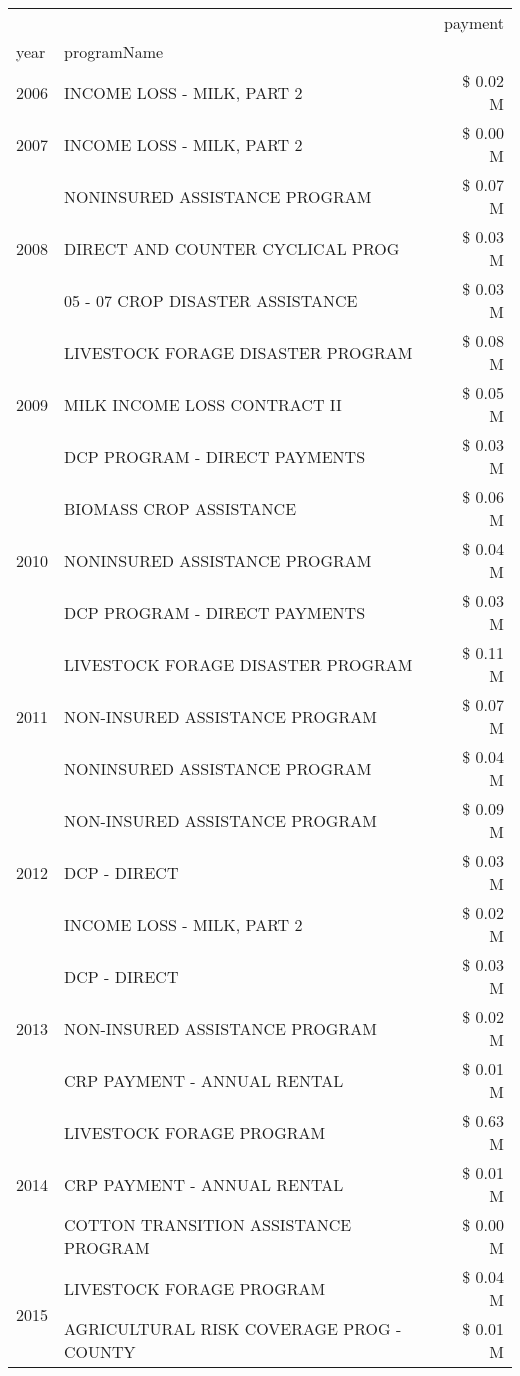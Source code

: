 \begin{tabular}{llr}
\toprule
 &  & payment \\
year & programName &  \\
\midrule
2006 & INCOME LOSS - MILK, PART 2 & \$ 0.02 M \\
\cline{1-3}
2007 & INCOME LOSS - MILK, PART 2 & \$ 0.00 M \\
\cline{1-3}
\multirow[t]{3}{*}{2008} & NONINSURED ASSISTANCE PROGRAM & \$ 0.07 M \\
 & DIRECT AND COUNTER CYCLICAL PROG & \$ 0.03 M \\
 & 05 - 07 CROP DISASTER ASSISTANCE & \$ 0.03 M \\
\cline{1-3}
\multirow[t]{3}{*}{2009} & LIVESTOCK FORAGE DISASTER  PROGRAM & \$ 0.08 M \\
 & MILK INCOME LOSS CONTRACT II & \$ 0.05 M \\
 & DCP PROGRAM - DIRECT PAYMENTS & \$ 0.03 M \\
\cline{1-3}
\multirow[t]{3}{*}{2010} & BIOMASS CROP ASSISTANCE & \$ 0.06 M \\
 & NONINSURED ASSISTANCE PROGRAM & \$ 0.04 M \\
 & DCP PROGRAM - DIRECT PAYMENTS & \$ 0.03 M \\
\cline{1-3}
\multirow[t]{3}{*}{2011} & LIVESTOCK FORAGE DISASTER PROGRAM & \$ 0.11 M \\
 & NON-INSURED ASSISTANCE PROGRAM & \$ 0.07 M \\
 & NONINSURED ASSISTANCE PROGRAM & \$ 0.04 M \\
\cline{1-3}
\multirow[t]{3}{*}{2012} & NON-INSURED ASSISTANCE PROGRAM & \$ 0.09 M \\
 & DCP - DIRECT & \$ 0.03 M \\
 & INCOME LOSS - MILK, PART 2 & \$ 0.02 M \\
\cline{1-3}
\multirow[t]{3}{*}{2013} & DCP - DIRECT & \$ 0.03 M \\
 & NON-INSURED ASSISTANCE PROGRAM & \$ 0.02 M \\
 & CRP PAYMENT - ANNUAL RENTAL & \$ 0.01 M \\
\cline{1-3}
\multirow[t]{3}{*}{2014} & LIVESTOCK FORAGE PROGRAM & \$ 0.63 M \\
 & CRP PAYMENT - ANNUAL RENTAL & \$ 0.01 M \\
 & COTTON TRANSITION ASSISTANCE PROGRAM & \$ 0.00 M \\
\cline{1-3}
\multirow[t]{3}{*}{2015} & LIVESTOCK FORAGE PROGRAM & \$ 0.04 M \\
 & AGRICULTURAL RISK COVERAGE PROG - COUNTY & \$ 0.01 M \\

\end{tabular}
